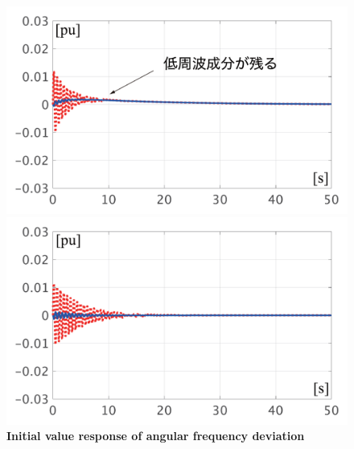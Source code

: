 \documentclass[tombow,dvipdfmx]{corona-a5-1.1}
\begin{document}
\begin{figure}[t]
  \centering
  {
  \begin{minipage}{0.49\linewidth}
    \centering
    \includegraphics[width = 1.0\linewidth]{figs/woAVRsmall}
  \end{minipage}
  \begin{minipage}{0.49\linewidth}
    \centering
    \includegraphics[width = 1.0\linewidth]{figs/wAVRsmall}
  \end{minipage}
  \medskip
  \caption{\textbf{Initial value response of angular frequency deviation}
  \\ 
  }
  \label{fig:avrsmalld}
  }
\medskip
\end{figure}
\end{document}
